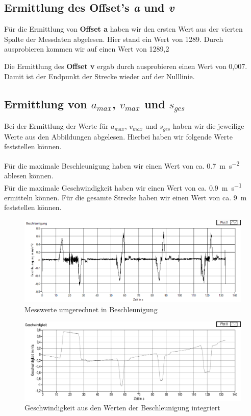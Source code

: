         \subsection{Ermittlung des Offset's \textit{a} und \textit{v}}
            Für die Ermittlung von \textbf{Offset a} haben wir den ersten Wert aus der vierten Spalte der Messdaten abgelesen. Hier stand ein Wert von 1289. Durch ausprobieren kommen wir auf einen Wert von 1289,2  \par
            Die Ermittlung des \textbf{Offset v} ergab durch ausprobieren einen Wert von 0,007. Damit ist der Endpunkt der Strecke wieder auf der Nulllinie.
        \subsection{Ermittlung von $a_{max}$, $v_{max}$ und $s_{ges}$}
            Bei der Ermittlung der Werte für $a_{max}$, $v_{max}$ und $s_{ges}$ haben wir die jeweilige Werte aus den Abbildungen abgelesen. 
            Hierbei haben wir folgende Werte feststellen können.\par
            Für die maximale Beschleunigung haben wir einen Wert von ca. \SI{0,7}{\meter\per\square\second} ablesen können.\\
            Für die maximale Geschwindigkeit haben wir einen Wert von ca. \SI{0,9}{\meter\per\second} ermitteln können.
            Für die gesamte Strecke haben wir einen Wert von ca. \SI{9}{\meter} feststellen können.
            \begin{figure}[ht!]
                \centering
                \includegraphics[width=\linewidth]{images/beschleunigung.png}
                \caption{Messwerte umgerechnet in Beschleunigung}
            \end{figure}
            \begin{figure}[ht!]
                \centering
                \includegraphics[width=\linewidth]{images/geschwindigkeit.eps}
                \caption{Geschwindigkeit aus den Werten der Beschleunigung integriert}
            \end{figure}
